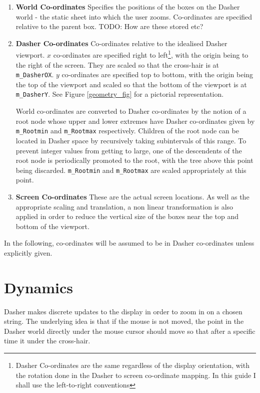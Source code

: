 \documentclass{article}
\begin{document}
\begin{enumerate}
\item {\bf World Co-ordinates} Specifies the positions of the boxes on the Dasher world - the static sheet into which the user zooms. Co-ordinates are specified relative to the parent box. TODO: How are these stored etc?
\item {\bf Dasher Co-ordinates} Co-ordinates relative to the idealised Dasher viewport. $x$ co-ordinates are specified right to left\footnote{Dasher Co-ordinates are the same regardless of the display orientation, with the rotation done in the Dasher to screen co-ordinate mapping. In this guide I shall use the left-to-right conventions}, with the origin being to the right of the screen. They are scaled so that the cross-hair is at {\tt m\_DasherOX}. $y$ co-ordinates are specified top to bottom, with the origin being the top of the viewport and scaled so that the bottom of the viewport is at {\tt m\_DasherY}. See Figure \ref{geometry_fig} for a pictorial representation.

World co-ordinates are converted to Dasher co-ordinates by the notion of a root node whose upper and lower extremes have Dasher co-ordinates given by {\tt m\_Rootmin} and {\tt m\_Rootmax} respectively. Children of the root node can be located in Dasher space by recursively taking subintervals of this range. To prevent integer values from getting to large, one of the descendents of the root node is periodically promoted to the root, with the tree above this point being discarded. {\tt m\_Rootmin} and {\tt m\_Rootmax} are scaled appropriately at this point.

\item {\bf Screen Co-ordinates} These are the actual screen locations. As well as the appropriate scaling and translation, a non linear transformation is also applied in order to reduce the vertical size of the boxes near the top and bottom of the viewport.

\end{enumerate}

In the following, co-ordinates will be assumed to be in Dasher co-ordinates unless explicitly given.

\section{Dynamics}

Dasher makes discrete updates to the display in order to zoom in on a chosen string. The underlying idea is that if the mouse is not moved, the point in the Dasher world directly under the mouse cursor should move so that after a specific time it under the cross-hair. 
\end{document}
